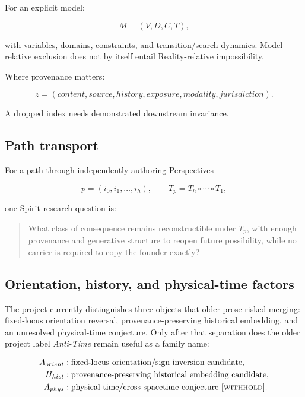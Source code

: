 \documentclass[11pt]{article}
\newcommand{\withhold}{\textsc{withhold}\xspace}
\begin{document}
For an explicit model:

\begin{equation}
M=(V,D,C,T),
\end{equation}

with variables, domains, constraints, and transition/search dynamics. Model-relative exclusion does not by itself entail Reality-relative impossibility.

Where provenance matters:

\begin{equation}
z=(content,source,history,exposure,modality,jurisdiction).
\end{equation}

A dropped index needs demonstrated downstream invariance.

\subsection{Path transport}

For a path through independently authoring Perspectives

\begin{equation}
p=(i_0,i_1,\ldots,i_h),\qquad T_p=T_h\circ\cdots\circ T_1,
\end{equation}

one Spirit research question is:

\begin{quote}
What class of consequence remains reconstructible under $T_p$, with enough provenance and generative structure to reopen future possibility, while no carrier is required to copy the founder exactly?
\end{quote}

\subsection{Orientation, history, and physical-time factors}

The project currently distinguishes three objects that older prose risked merging: fixed-locus orientation reversal, provenance-preserving historical embedding, and an unresolved physical-time conjecture. Only after that separation does the older project label \emph{Anti-Time} remain useful as a family name:

\begin{align}
A_{orient} &: \text{fixed-locus orientation/sign inversion candidate},\\
H_{hist} &: \text{provenance-preserving historical embedding candidate},\\
A_{phys} &: \text{physical-time/cross-spacetime conjecture }[\withhold].
\end{align}
\end{document}
